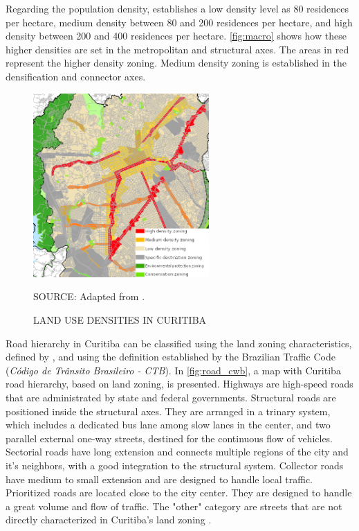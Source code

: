 Regarding the population density, \textcite{Curitiba2015} establishes a low density level as 80 residences per hectare, medium density between 80 and 200 residences per hectare, and high density between 200 and 400 residences per hectare. \autoref{fig:macro} shows how these higher densities are set in the metropolitan and structural axes. The areas in red represent the higher density zoning. Medium density zoning is established in the densification and connector axes. 

\begin{figure}[!htbp]
    \centering\footnotesize
    \captionsetup{font=footnotesize}
    \caption{LAND USE DENSITIES IN CURITIBA}
    \includegraphics[width=0.6\textwidth]{fig/macro3.png}
    \label{fig:macro}
    \par SOURCE: Adapted from \textcite{Curitiba2015}.
\end{figure}

Road hierarchy in Curitiba can be classified using the land zoning characteristics, defined by \textcite{Curitiba2019a}, and using the definition established by the Brazilian Traffic Code (\textit{Código de Trânsito Brasileiro - CTB}). In \autoref{fig:road_cwb}, a map with Curitiba road hierarchy, based on land zoning, is presented. Highways are high-speed roads that are administrated by state and federal governments. Structural roads are positioned inside the structural axes. They are arranged in a trinary system, which includes a dedicated bus lane among slow lanes in the center, and two parallel external one-way streets, destined for the continuous flow of vehicles. Sectorial roads have long extension and connects multiple regions of the city and it's neighbors, with a good integration to the structural system. Collector roads have medium to small extension and are designed to handle local traffic. Prioritized roads are located close to the city center. They are designed to handle a great volume and flow of traffic. The "other" category are streets that are not directly characterized in Curitiba's land zoning \cite{Curitiba2019a}. 

